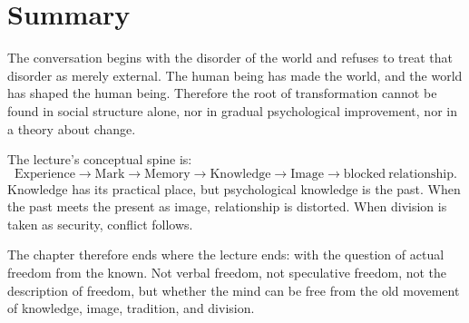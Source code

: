\section{Summary}

The conversation begins with the disorder of the world and refuses to treat that disorder as merely external. The human being has made the world, and the world has shaped the human being. Therefore the root of transformation cannot be found in social structure alone, nor in gradual psychological improvement, nor in a theory about change.

The lecture's conceptual spine is:
\begin{equation}
\mathrm{Experience}
\longrightarrow
\mathrm{Mark}
\longrightarrow
\mathrm{Memory}
\longrightarrow
\mathrm{Knowledge}
\longrightarrow
\mathrm{Image}
\longrightarrow
\mathrm{blocked\ relationship}.
\end{equation}
Knowledge has its practical place, but psychological knowledge is the past. When the past meets the present as image, relationship is distorted. When division is taken as security, conflict follows.

The chapter therefore ends where the lecture ends: with the question of actual freedom from the known. Not verbal freedom, not speculative freedom, not the description of freedom, but whether the mind can be free from the old movement of knowledge, image, tradition, and division.
